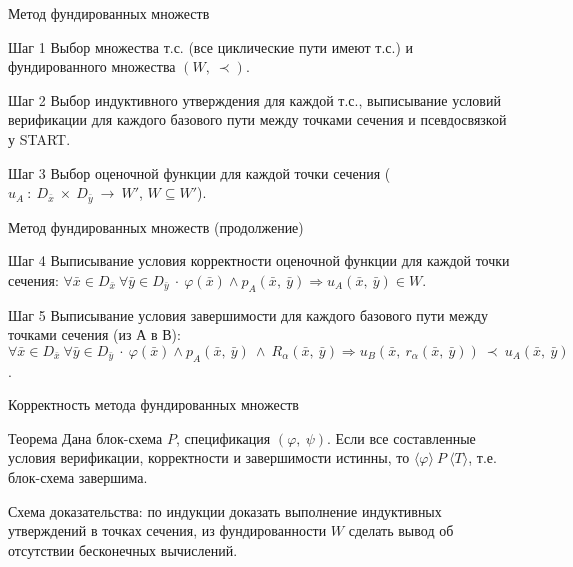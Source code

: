 \documentclass[hyperref={unicode=true}]{beamer}
\begin{document}
	\begin{frame}{Метод фундированных множеств}

    \begin{block}{Шаг 1}
	Выбор множества т.с. (все циклические пути имеют т.с.) и фундированного множества $(W,~\prec)$.
	\end{block}
	\begin{block}{Шаг 2}
	Выбор индуктивного утверждения для каждой т.с., выписывание условий верификации для каждого
	базового пути между точками сечения и псевдосвязкой у START.
	\end{block}
	\begin{block}{Шаг 3}
	Выбор оценочной функции для каждой точки сечения ($u_A~:~D_{\bar{x}}~\times~D_{\bar{y}}~\rightarrow~W'$, $W \subseteq W'$).
	\end{block}
	\end{frame}

	\begin{frame}{Метод фундированных множеств (продолжение)}

	\begin{block}{Шаг 4}
	Выписывание условия корректности оценочной функции для каждой точки сечения:
	$\forall \bar{x} \in D_{\bar{x}} ~\forall \bar{y} \in D_{\bar{y}} ~\cdot~
	\varphi(\bar{x}) \land p_A(\bar{x},~\bar{y}) \Rightarrow u_A(\bar{x},~\bar{y}) \in W$.
	\end{block}
	\begin{block}{Шаг 5}
	Выписывание условия завершимости для каждого базового пути между точками сечения (из А в В):
	$\forall \bar{x} \in D_{\bar{x}} ~ \forall \bar{y} \in D_{\bar{y}} ~\cdot~
	\varphi(\bar{x}) \land p_A(\bar{x},~\bar{y})~\land~R_\alpha(\bar{x},~\bar{y}) \Rightarrow
	u_B(\bar{x},~r_\alpha(\bar{x},~\bar{y})) ~\prec~ u_A(\bar{x},~\bar{y})$.
	\end{block}
	\end{frame}

	\begin{frame}{Корректность метода фундированных множеств}

	\begin{block}{Теорема}
	Дана блок-схема $P$, спецификация $(\varphi,~\psi)$. Если все составленные условия верификации, корректности и завершимости истинны, то $\langle\varphi\rangle~P~\langle T \rangle$, т.е. блок-схема завершима.
	\end{block}

    Схема доказательства: по индукции доказать выполнение индуктивных утверждений в точках сечения, из фундированности $W$ сделать вывод об отсутствии бесконечных вычислений.
	\end{frame}
\end{document}
